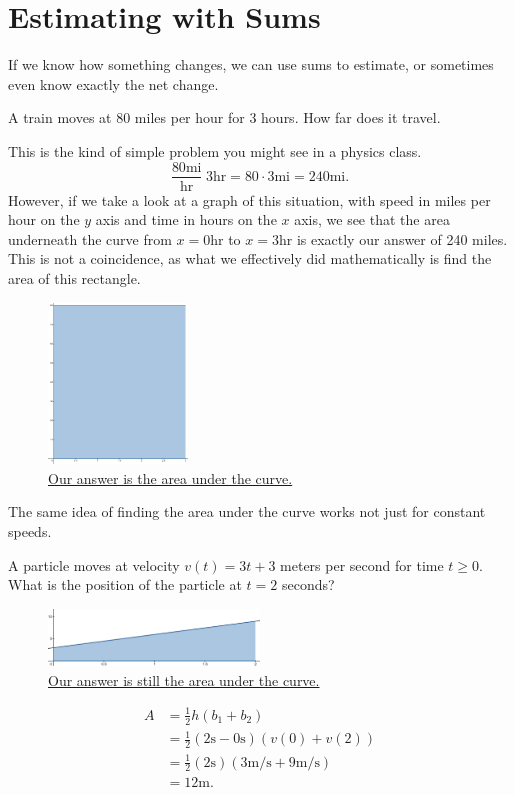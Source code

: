 \section{Estimating with Sums}
If we know how something changes, we can use sums to estimate, or sometimes even know exactly the net change.

\begin{example}
	A train moves at 80 miles per hour for 3 hours.
	How far does it travel.
\end{example}
This is the kind of simple problem you might see in a physics class.
\begin{equation*}
	\frac{80\text{mi}}{\text{hr}} \hspace{3pt} 3\text{hr} = 80\cdot 3\text{mi} = 240 \text{mi}.
\end{equation*}
However, if we take a look at a graph of this situation, with speed in miles per hour on the $y$ axis and time in hours on the $x$ axis, we see that the area underneath the curve from $x=0\text{hr}$ to $x=3\text{hr}$ is exactly our answer of 240 miles.
This is not a coincidence, as what we effectively did mathematically is find the area of this rectangle.

\begin{figure}[H]
	\label{constant_graph}
	\centering
	\includegraphics[width = 0.33\textwidth]{./integrals/constant_graph.png}
	\caption{\hyperref{}{}{}{Our answer is the area under the curve.}}
\end{figure}

\noindent
The same idea of finding the area under the curve works not just for constant speeds.
\begin{example}
	A particle moves at velocity $v(t) = 3t + 3$ meters per second for time $t \geq 0$.
	What is the position of the particle at $t = 2$ seconds?
\end{example}
\begin{figure}[H]
	\label{linear_graph}
	\centering
	\includegraphics[width = 0.5\textwidth]{./integrals/linear_graph.png}
	\caption{\hyperref{}{}{}{Our answer is still the area under the curve.}}
\end{figure}
\begin{align*}
	A &= \frac{1}{2}h(b_1 + b_2) \\
	&= \frac{1}{2}(2\text{s}-0\text{s})(v(0) + v(2)) \\
	&= \frac{1}{2}(2\text{s})(3\text{m/s} + 9\text{m/s}) \\
	&= 12\text{m}.
\end{align*}

